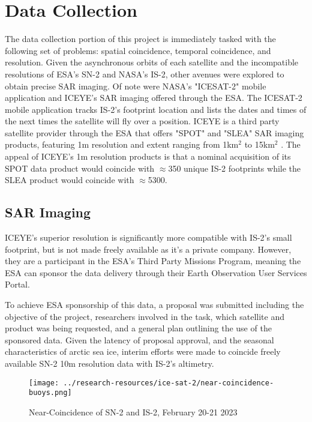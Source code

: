 \chapter{Data Collection}
\label{sec:Data_Collection}

The data collection portion of this project is immediately tasked with the following set of problems: spatial coincidence, temporal coincidence, and resolution. Given the asynchronous orbits of each satellite and the incompatible resolutions of ESA's SN-2 and NASA's IS-2, other avenues were explored to obtain precise SAR imaging. Of note were NASA's "ICESAT-2" mobile application and ICEYE's\textsuperscript{\tiny\textcopyright} SAR imaging offered through the ESA. The ICESAT-2 mobile application tracks IS-2's footprint location and lists the dates and times of the next times the satellite will fly over a position. ICEYE is a third party satellite provider through the ESA that offers "SPOT" and "SLEA" SAR imaging products, featuring 1m resolution and extent ranging from 1km$^2$ to 15km$^2$ \cite{iceye-products}. The appeal of ICEYE's 1m resolution products is that a nominal acquisition of its SPOT data product would coincide with $\approx$350 unique IS-2 footprints while the SLEA product would coincide with $\approx$5300.

\section {SAR Imaging}
ICEYE's superior resolution is significantly more compatible with IS-2's small footprint, but is not made freely available as it's a private company. However, they are a participant in the ESA's Third Party Missions Program, meaning the ESA can sponsor the data delivery through their Earth Observation User Services Portal. 

To achieve ESA sponsorship of this data, a proposal was submitted including the objective of the project, researchers involved in the task, which satellite and product was being requested, and a general plan outlining the use of the sponsored data. Given the latency of proposal approval, and the seasonal characteristics of arctic sea ice, interim efforts were made to coincide freely available SN-2 10m resolution data with IS-2's altimetry.

\begin{figure}[h]
    \centering
	\texttt{[image: ../research-resources/ice-sat-2/near-coincidence-buoys.png]}
    \label{near-coincidence}
    \caption[Existing Coincident Data Unavailability]{Near-Coincidence of SN-2 and IS-2, February 20-21 2023}
\end{figure}

